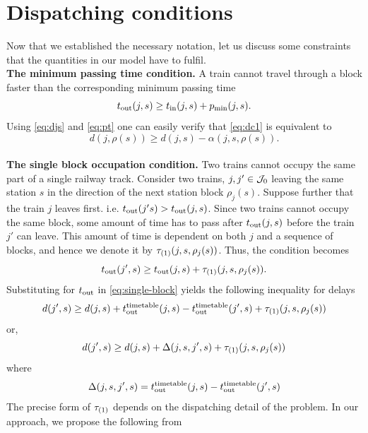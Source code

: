 \section{Dispatching conditions}
Now that we established the necessary notation, let us discuss some constraints that the quantities
in our model have to fulfil.\\
\textbf{The minimum passing time condition.} A train cannot travel through a block faster than the corresponding minimum passing time
\begin{equation}
    \label{eq:dc1}
t_\text{out}(j, s) \ge t_\text{in}(j, s) + p_\text{min}(j, s).
\end{equation}
Using \eqref{eq:djs} and \eqref{eq:pt} one can easily verify that \eqref{eq:dc1} is equivalent to
\begin{equation}
    d(j, \rho(s)) \ge d(j, s) - \alpha(j, s, \rho(s)).
\end{equation}\\
\textbf{The single block occupation condition.} Two trains cannot occupy the same part of a single
railway track. Consider two trains, $j, j' \in \mathcal{J}_0$ leaving the same station $s$ in the direction
of the next station block $\rho_j(s)$. Suppose further that the train $j$ leaves first. i.e.
$t_\text{out}(j's) > t_\text{out}(j, s)$. Since two trains cannot occupy the same block, some amount of time has
to pass after $t_\text{out}(j, s)$ before the train $j'$ can leave. This amount of time is dependent on
both $j$ and a sequence of blocks, and hence we denote it by $\tau_{(1)}(j, s, \rho_j(s))$. Thus, the
condition becomes
\begin{equation}
\label{eq:single-block}
t_\text{out}(j', s) \ge t_\text{out}(j, s) + \tau_{(1)}(j, s, \rho_j(s)).
\end{equation}
Substituting for $t_\text{out}$ in \eqref{eq:single-block} yields the following inequality for delays
\begin{equation}
\label{eq:single-block-delays}
d(j', s) \ge d(j, s) + t_\text{out}^\text{timetable}(j, s) - t_\text{out}^\text{timetable}(j', s) + \tau_{(1)}(j, s, \rho_j(s))
\end{equation}
or,
\begin{equation}
d(j', s) \ge d(j, s) + \Delta(j, s, j', s) + \tau_{(1)}(j, s, \rho_j(s))
\end{equation}
where
\begin{equation}
\label{eq:delta}
\Delta(j, s, j', s) = t_\text{out}^\text{timetable}(j, s) - t_\text{out}^\text{timetable}(j', s)
\end{equation}
The precise form of $\tau_{(1)}$ depends on the dispatching detail of the problem. In our approach, we
propose the following from
